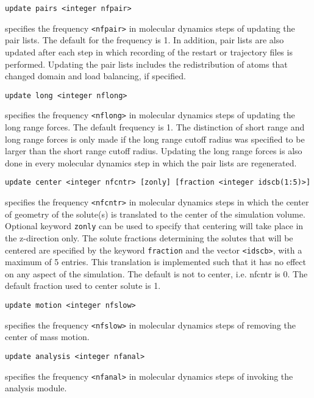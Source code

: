 \begin{description}
\item
\begin{verbatim}
update pairs <integer nfpair>
\end{verbatim}
specifies the frequency \verb+<nfpair>+ in molecular dynamics steps of 
updating the pair lists. The default for the frequency is 1.
In addition, pair lists are also updated after each step in which
recording of the restart or trajectory files is performed. Updating
the pair lists includes the redistribution of atoms that changed
domain and load balancing, if specified.

\item
\begin{verbatim}
update long <integer nflong>
\end{verbatim}
specifies the frequency \verb+<nflong>+ in molecular dynamics steps 
of updating the long range forces. The default frequency is 1.
The distinction of short range and long range forces is only
made if the long range cutoff radius was specified to be larger
than the short range cutoff radius. Updating the long range forces
is also done in every molecular dynamics step in which the
pair lists are regenerated.

\item
\begin{verbatim}
update center <integer nfcntr> [zonly] [fraction <integer idscb(1:5)>]
\end{verbatim}
specifies the frequency \verb+<nfcntr>+ in molecular dynamics steps in 
which the center of geometry of the solute(s) is translated to the
center of the simulation volume. Optional keyword \verb+zonly+ can be
used to specify that centering will take place in the z-direction
only.
The solute fractions determining the
solutes that will be centered are specified by the keyword 
{\tt fraction} and the vector \verb+<idscb>+, with a maximum of 5 entries.
This translation is implemented such that it has no effect on any 
aspect of the simulation. The default is not to center, i.e. nfcntr is
0. The default fraction used to center solute is 1.

\item
\begin{verbatim}
update motion <integer nfslow>
\end{verbatim}
specifies the frequency \verb+<nfslow>+ in molecular dynamics steps of
removing the center of mass motion.

\item
\begin{verbatim}
update analysis <integer nfanal>
\end{verbatim}
specifies the frequency \verb+<nfanal>+ in molecular dynamics steps of
invoking the analysis module.


\end{description}
